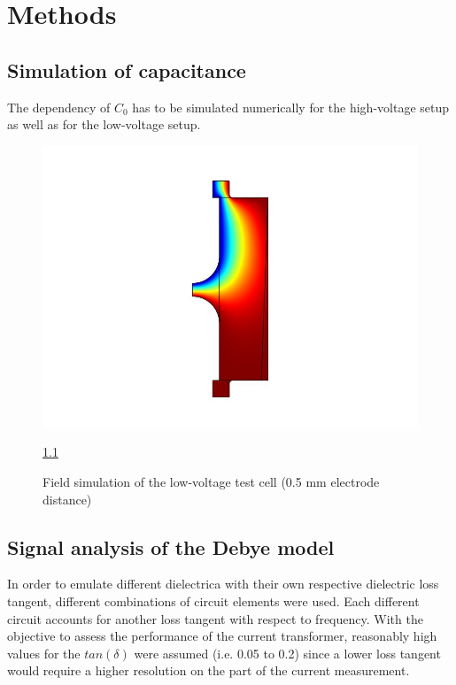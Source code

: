 \chapter{Methods}

\section{Simulation of capacitance} \label{sec.analysecurrent}
The dependency of $C_0$ has to be simulated numerically for the high-voltage setup as well as for the low-voltage setup. 
\begin{figure}[htbp]
	\centering
	\includegraphics{figures/COMSOL_Beispielbild.jpg}		
	\caption[Kurze Abbildungsbeschreibung]{Field simulation of the low-voltage test cell (0.5 mm electrode distance)} \ref{sec.analysecurrent}
	\label{fig.waveforms}
\end{figure}
 

\section{Signal analysis of the Debye model}

In order to emulate different dielectrica with their own respective dielectric loss tangent, different combinations of circuit elements were used. Each different circuit accounts for another loss tangent with respect to frequency. With the objective to assess the performance of the current transformer, reasonably high values for the $tan\left(\delta\right)$ were assumed (i.e. 0.05 to 0.2) since a lower loss tangent would require a higher resolution on the part of the current measurement.


